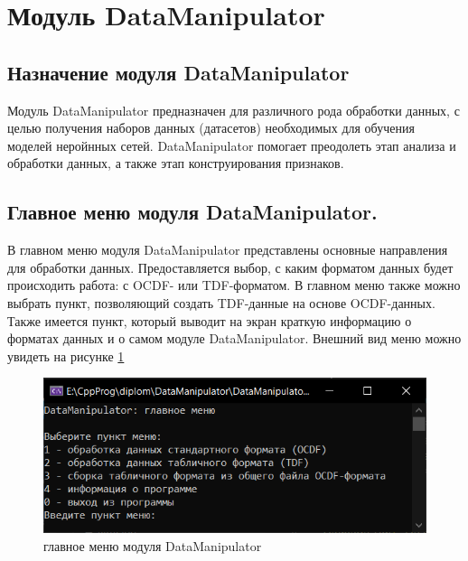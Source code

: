 \sectionbreak \section{  \standartTitleFont
  Модуль DataManipulator
} \label{sec:DataManipulator}

\subsection{ \standartTitleFont
  Назначение модуля DataManipulator
} \label{subsec:targerDM}

{\standartFont

  \par Модуль DataManipulator предназначен для различного рода обработки данных, с целью получения наборов данных (датасетов) необходимых для обучения моделей неройнных сетей. DataManipulator помогает преодолеть этап анализа и обработки данных, а также этап конструирования признаков.

  \par
}

\subsection{ \standartTitleFont
  Главное меню модуля DataManipulator.
} \label{subsec:MainMenuDM}

{\standartFont

  \par В главном меню модуля DataManipulator представлены основные направления для обработки данных. Предоставляется выбор, с каким форматом данных будет происходить работа: с OCDF- или TDF-форматом. В главном меню также можно выбрать пункт, позволяющий создать TDF-данные на основе OCDF-данных. Также имеется пункт, который выводит на экран краткую информацию о форматах данных и о самом модуле DataManipulator. Внешний вид меню можно увидеть на рисунке \ref{fig:mainMenu}

  \par

  \begin{figure}[H]
    \centering
    \includegraphics{images/forDataManipulator/mainMenu.png}
    \caption{главное меню модуля DataManipulator}
    \label{fig:mainMenu}
  \end{figure}

}

